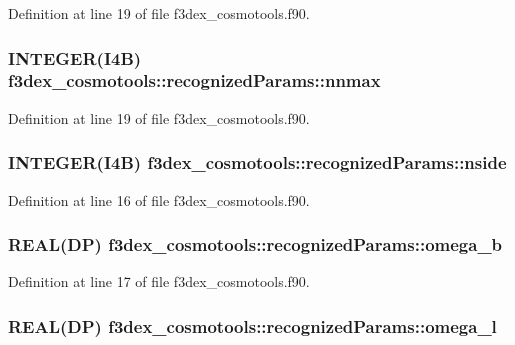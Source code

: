 Definition at line 19 of file f3dex\_\-cosmotools.f90.

\hypertarget{typef3dex__cosmotools_1_1recognized_params_ab7d187abd89f3a1ef4be507a966803ae}{
\subsubsection[{nnmax}]{\setlength{\rightskip}{0pt plus 5cm}INTEGER(I4B) {\bf f3dex\_\-cosmotools::recognizedParams::nnmax}}}
\label{typef3dex__cosmotools_1_1recognized_params_ab7d187abd89f3a1ef4be507a966803ae}


Definition at line 19 of file f3dex\_\-cosmotools.f90.

\hypertarget{typef3dex__cosmotools_1_1recognized_params_ac0f1c10328111e02b1bfbe5c368b1eb7}{
\subsubsection[{nside}]{\setlength{\rightskip}{0pt plus 5cm}INTEGER(I4B) {\bf f3dex\_\-cosmotools::recognizedParams::nside}}}
\label{typef3dex__cosmotools_1_1recognized_params_ac0f1c10328111e02b1bfbe5c368b1eb7}


Definition at line 16 of file f3dex\_\-cosmotools.f90.

\hypertarget{typef3dex__cosmotools_1_1recognized_params_a980f98fea94e5d7b6fee2996744dcdf0}{
\subsubsection[{omega\_\-b}]{\setlength{\rightskip}{0pt plus 5cm}REAL(DP) {\bf f3dex\_\-cosmotools::recognizedParams::omega\_\-b}}}
\label{typef3dex__cosmotools_1_1recognized_params_a980f98fea94e5d7b6fee2996744dcdf0}


Definition at line 17 of file f3dex\_\-cosmotools.f90.

\hypertarget{typef3dex__cosmotools_1_1recognized_params_a8f92a79b3b1828d146cc09b9dd88d0ae}{
\subsubsection[{omega\_\-l}]{\setlength{\rightskip}{0pt plus 5cm}REAL(DP) {\bf f3dex\_\-cosmotools::recognizedParams::omega\_\-l}}}
\label{typef3dex__cosmotools_1_1recognized_params_a8f92a79b3b1828d146cc09b9dd88d0ae}


